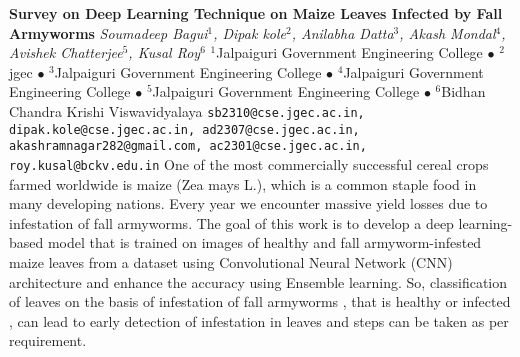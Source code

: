 
    \begin{conf-abstract}[]
        {\textbf{Survey on Deep Learning Technique on Maize Leaves Infected by Fall Armyworms}}
        {\textit{Soumadeep Bagui$^{1}$, Dipak kole$^{2}$, Anilabha  Datta$^{3}$, Akash Mondal$^{4}$, Avishek  Chatterjee$^{5}$, Kusal Roy$^{6}$}}
        {$^{1}$Jalpaiguri Government Engineering College $\bullet$ $^{2}$jgec $\bullet$ $^{3}$Jalpaiguri Government Engineering College $\bullet$ $^{4}$Jalpaiguri Government Engineering College $\bullet$ $^{5}$Jalpaiguri Government Engineering College $\bullet$ $^{6}$Bidhan Chandra Krishi Viswavidyalaya}
        {\texttt{sb2310@cse.jgec.ac.in, dipak.kole@cse.jgec.ac.in, ad2307@cse.jgec.ac.in, akashramnagar282@gmail.com, ac2301@cse.jgec.ac.in, roy.kusal@bckv.edu.in}}
        {One of the most commercially successful cereal crops farmed worldwide is maize (Zea mays L.), which is a common staple food in many developing nations. Every year we encounter massive yield losses due to infestation of fall armyworms. The goal of this work is to develop a deep learning-based model that is trained on images of healthy and fall armyworm-infested maize leaves from a dataset using Convolutional Neural Network (CNN) architecture and enhance the accuracy using Ensemble learning. So, classification of leaves on the basis of infestation of fall armyworms , that is healthy or infected , can lead to early detection of infestation in leaves and steps can be taken as per requirement.}
    \end{conf-abstract}
        